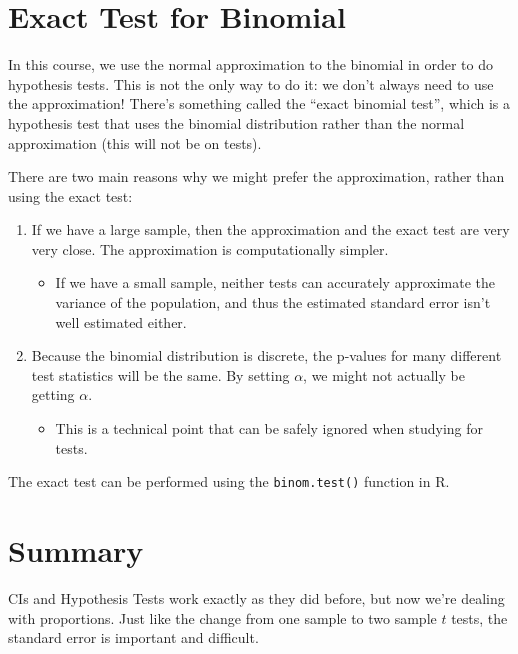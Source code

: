 \documentclass[
  letterpaper,
  DIV=11,
  numbers=noendperiod]{scrreprt}
\providecommand{\tightlist}{%
  \setlength{\itemsep}{0pt}\setlength{\parskip}{0pt}}\usepackage{longtable,booktabs,array}
\begin{document}
\hypertarget{exact-test-for-binomial}{%
\section{Exact Test for Binomial}\label{exact-test-for-binomial}}

In this course, we use the normal approximation to the binomial in order
to do hypothesis tests. This is not the only way to do it: we don't
always need to use the approximation! There's something called the
``exact binomial test'', which is a hypothesis test that uses the
binomial distribution rather than the normal approximation (this will
not be on tests).

There are two main reasons why we might prefer the approximation, rather
than using the exact test:

\begin{enumerate}
\def\labelenumi{\arabic{enumi}.}
\tightlist
\item
  If we have a large sample, then the approximation and the exact test
  are very very close. The approximation is computationally simpler.

  \begin{itemize}
  \tightlist
  \item
    If we have a small sample, neither tests can accurately approximate
    the variance of the population, and thus the estimated standard
    error isn't well estimated either.
  \end{itemize}
\item
  Because the binomial distribution is discrete, the p-values for many
  different test statistics will be the same. By setting \(\alpha\), we
  might not actually be getting \(\alpha\).

  \begin{itemize}
  \tightlist
  \item
    This is a technical point that can be safely ignored when studying
    for tests.
  \end{itemize}
\end{enumerate}

The exact test can be performed using the \texttt{binom.test()} function
in R.

\hypertarget{summary-8}{%
\section{Summary}\label{summary-8}}

CIs and Hypothesis Tests work exactly as they did before, but now we're
dealing with proportions. Just like the change from one sample to two
sample \(t\) tests, the standard error is important and difficult.
\end{document}
